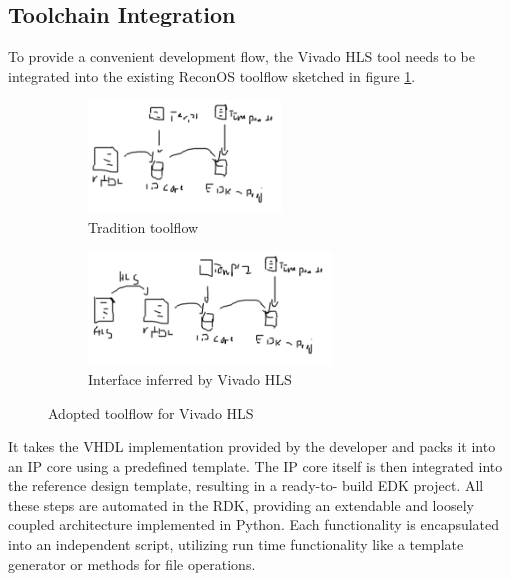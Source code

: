 \subsection{Toolchain Integration}
To provide a convenient development flow, the Vivado HLS tool needs to be
integrated into the existing ReconOS toolflow sketched in figure
\ref{fig:rdk_o}.
\begin{figure}
	\centering
	\begin{subfigure}{0.49\textwidth}
		\centering
		\includegraphics[height=3cm]{../figures/rdk_o}
		\caption{Tradition toolflow}
		\label{fig:rdk_o}
	\end{subfigure}
	\begin{subfigure}{0.49\textwidth}
		\centering
		\includegraphics[height=3cm]{../figures/rdk_h}
		\caption{Interface inferred by Vivado HLS}
		\label{fig:rdk_h}
	\end{subfigure}
	\caption{Adopted toolflow for Vivado HLS}
	\label{fig:rdk}
\end{figure}
It takes the \ac{VHDL} implementation provided by the developer and packs it
into an \ac{IP} core using a predefined template. The \ac{IP} core itself is
then integrated into the reference design template, resulting in a ready-to-
build EDK project. All these steps are automated in the \ac{RDK}, providing an
extendable and loosely coupled architecture implemented in Python. Each
functionality is encapsulated into an independent script, utilizing run time
functionality like a template generator or methods for file operations.

